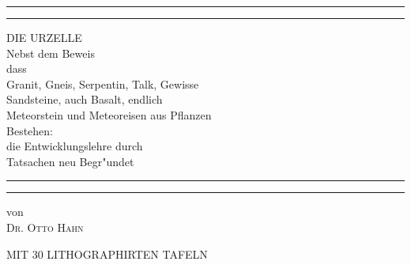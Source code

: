 \documentclass[a4paper, 11pt, oneside, german]{article}
\begin{document}
\begin{titlepage} %
	\centering %
	\scshape %

	
	\rule{\textwidth}{1.6pt}\vspace*{-\baselineskip}\vspace*{2pt} %
	\rule{\textwidth}{0.4pt} %
	
	\vspace{0.75\baselineskip} %
	
	{\LARGE DIE URZELLE\\}
	\vspace{0.75\baselineskip}
	{\large Nebst dem Beweis\\ dass\\ Granit, Gneis, Serpentin, Talk, Gewisse\\ Sandsteine, auch Basalt, endlich\\ Meteorstein und Meteoreisen aus Pflanzen\\ Bestehen:\\ die Entwicklungslehre durch\\ Tatsachen neu Begr"undet\\} %
	
	\vspace{0.75\baselineskip} %
	
	\rule{\textwidth}{0.4pt}\vspace*{-\baselineskip}\vspace{3.2pt} %
	\rule{\textwidth}{1.6pt} %
	
	\vspace{1\baselineskip} %
	
	
	{von\\ \scshape\Large Dr. Otto Hahn\\} %
	
	\vspace*{1\baselineskip} %
	
    {\small MIT 30 LITHOGRAPHIRTEN TAFELN} %
    

\end{titlepage}
\end{document}
